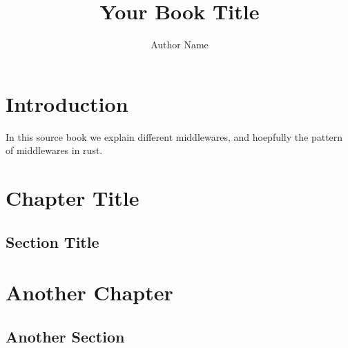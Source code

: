\documentclass[12pt,openany]{scrbook}
\title{Your Book Title}
\author{Author Name}
\date{}
\begin{document}
\maketitle

\tableofcontents

\chapter{Introduction}
In this source book we explain different middlewares, and hoepfully the pattern of middlewares in rust.
\chapter{Chapter Title}
\section{Section Title}

\chapter{Another Chapter}
\section{Another Section}
\end{document}
